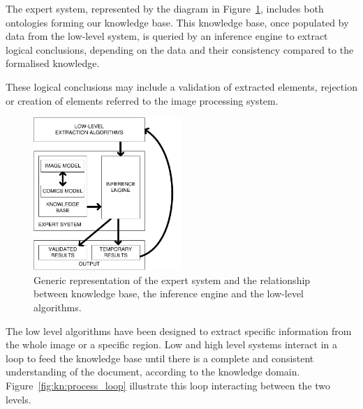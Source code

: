 The expert system, represented by the diagram in Figure~\ref{fig:kn:generic_expert_system}, includes both ontologies forming our knowledge base.
This knowledge base, once populated by data from the low-level system, is queried by an inference engine to extract logical conclusions, depending on the data and their consistency compared to the formalised knowledge.

These logical conclusions may include a validation of extracted elements, rejection or creation of elements referred to the image processing system.


 \begin{figure}[!ht]  %
   \centering
  \includegraphics[trim= 0px 0px 0px 0px, clip, width=0.5\textwidth]{expert_system.pdf}
  \caption[Generic representation of the expert system and the relationship between knowledge base, the inference engine and the low-level algorithms]{Generic representation of the expert system and the relationship between knowledge base, the inference engine and the low-level algorithms.}
  \label{fig:kn:generic_expert_system}
 \end{figure}

The low level algorithms have been designed to extract specific information from the whole image or a specific region.
Low and high level systems interact in a loop to feed the knowledge base until there is a complete and consistent understanding of the document, according to the knowledge domain. 
Figure~\ref{fig:kn:process_loop} illustrate this loop interacting between the two levels.

